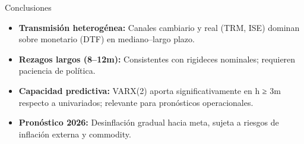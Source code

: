 \documentclass[aspectratio=169, 11pt]{beamer}
\begin{document}
\begin{frame}{Conclusiones}
\normalsize
\vspace{0.3cm}

\begin{itemize}
  \item \textbf{Transmisión heterogénea:} Canales cambiario y real (TRM, ISE) dominan sobre monetario (DTF) en mediano–largo plazo.
  \vspace{0.15cm}
  
  \item \textbf{Rezagos largos (8–12m):} Consistentes con rigideces nominales; requieren paciencia de política.
  \vspace{0.15cm}
  
  \item \textbf{Capacidad predictiva:} VARX(2) aporta significativamente en h ≥ 3m respecto a univariados; relevante para pronósticos operacionales.
  \vspace{0.15cm}
  
  \item \textbf{Pronóstico 2026:} Desinflación gradual hacia meta, sujeta a riesgos de inflación externa y commodity.
\end{itemize}
\end{frame}
\end{document}
